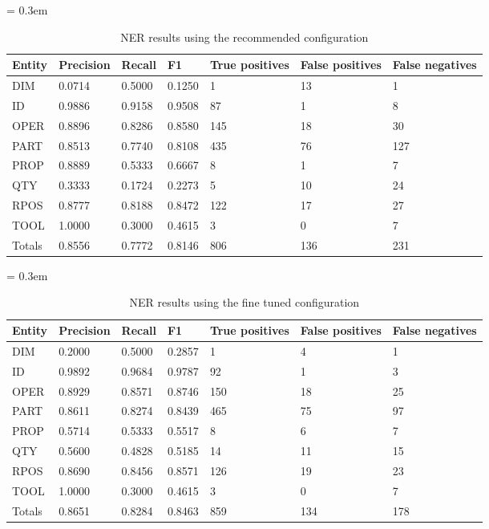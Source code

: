\begin{table}[ht]
	\caption{NER results using the recommended configuration}
	\tabulinesep = 0.3em
	\setlength{\tabcolsep}{0.2em}
	\centering
	\begin{tabu} { X[c,m] X[r,m] X[r,m] X[r,m] X[r,m] X[r,m] X[r,m] }
		\rowfont{\bfseries\itshape} Entity & Precision & Recall & F1 & True positives & False positives & False negatives \\
		\hline
		DIM & 0.0714 & 0.5000 & 0.1250 & 1 & 13 & 1 \\
		ID & 0.9886 & 0.9158 & 0.9508 & 87 & 1 & 8 \\
		OPER & 0.8896 & 0.8286 & 0.8580 & 145 & 18 & 30 \\
		PART & 0.8513 & 0.7740 & 0.8108 & 435 & 76 & 127 \\
		PROP & 0.8889 & 0.5333 & 0.6667 & 8 & 1 & 7 \\
		QTY & 0.3333 & 0.1724 & 0.2273 & 5 & 10 & 24 \\
		RPOS & 0.8777 & 0.8188 & 0.8472 & 122 & 17 & 27 \\
		TOOL & 1.0000 & 0.3000 & 0.4615 & 3 & 0 & 7 \\
		\rowfont{\bfseries} Totals & 0.8556 & 0.7772 & 0.8146 & 806 & 136 & 231 \\
	\end{tabu}
	\label{tab:results_recommended-configuration}
\end{table}


\begin{table}[ht]
	\caption{NER results using the fine tuned configuration}
	\tabulinesep = 0.3em
	\setlength{\tabcolsep}{0.2em}
	\centering
	\begin{tabu} { X[c,m] X[r,m] X[r,m] X[r,m] X[r,m] X[r,m] X[r,m] }
		\rowfont{\bfseries\itshape} Entity & Precision & Recall & F1 & True positives & False positives & False negatives \\
		\hline
		DIM & 0.2000 & 0.5000 & 0.2857 & 1 & 4 & 1 \\
		ID & 0.9892 & 0.9684 & 0.9787 & 92 & 1 & 3 \\
		OPER & 0.8929 & 0.8571 & 0.8746 & 150 & 18 & 25 \\
		PART & 0.8611 & 0.8274 & 0.8439 & 465 & 75 & 97 \\
		PROP & 0.5714 & 0.5333 & 0.5517 & 8 & 6 & 7 \\
		QTY & 0.5600 & 0.4828 & 0.5185 & 14 & 11 & 15 \\
		RPOS & 0.8690 & 0.8456 & 0.8571 & 126 & 19 & 23 \\
		TOOL & 1.0000 & 0.3000 & 0.4615 & 3 & 0 & 7 \\
		\rowfont{\bfseries} Totals & 0.8651 & 0.8284 & 0.8463 & 859 & 134 & 178 \\
	\end{tabu}
	\label{tab:results_optimal-configuration}
\end{table}
